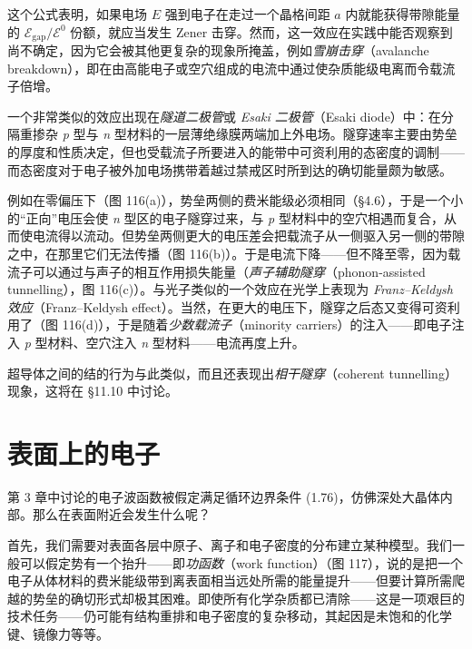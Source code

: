这个公式表明，如果电场 $E$ 强到电子在走过一个晶格间距 $a$ 内就能获得带隙能量的 $\mathcal{E}_{\mathrm{gap}}/\mathcal{E}^{0}$ 份额，就应当发生 Zener 击穿。然而，这一效应在实践中能否观察到尚不确定，因为它会被其他更复杂的现象所掩盖，例如\emph{雪崩击穿}（avalanche breakdown），即在由高能电子或空穴组成的电流中通过使杂质能级电离而令载流子倍增。


一个非常类似的效应出现在\emph{隧道二极管}或 \emph{Esaki 二极管}（Esaki diode）中：在分隔重掺杂 \emph{p} 型与 \emph{n} 型材料的一层薄绝缘膜两端加上外电场。隧穿速率主要由势垒的厚度和性质决定，但也受载流子所要进入的能带中可资利用的态密度的调制——而态密度对于电子被外加电场携带着越过禁戒区时所到达的确切能量颇为敏感。

例如在零偏压下（图 116(a)），势垒两侧的费米能级必须相同（§4.6），于是一个小的“正向”电压会使 \emph{n} 型区的电子隧穿过来，与 \emph{p} 型材料中的空穴相遇而复合，从而使电流得以流动。但势垒两侧更大的电压差会把载流子从一侧驱入另一侧的带隙之中，在那里它们无法传播（图 116(b)）。于是电流下降——但不降至零，因为载流子可以通过与声子的相互作用损失能量（\emph{声子辅助隧穿}（phonon-assisted tunnelling），图 116(c)）。与光子类似的一个效应在光学上表现为 \emph{Franz--Keldysh 效应}（Franz--Keldysh effect）。当然，在更大的电压下，隧穿之后态又变得可资利用了（图 116(d)），于是随着\emph{少数载流子}（minority carriers）的注入——即电子注入 \emph{p} 型材料、空穴注入 \emph{n} 型材料——电流再度上升。

超导体之间的结的行为与此类似，而且还表现出\emph{相干隧穿}（coherent tunnelling）现象，这将在 §11.10 中讨论。

\section{表面上的电子}

第 3 章中讨论的电子波函数被假定满足循环边界条件 (1.76)，仿佛深处大晶体内部。那么在表面附近会发生什么呢？

首先，我们需要对表面各层中原子、离子和电子密度的分布建立某种模型。我们一般可以假定势有一个抬升——即\emph{功函数}（work function）（图 117），说的是把一个电子从体材料的费米能级带到离表面相当远处所需的能量提升——但要计算所需爬越的势垒的确切形式却极其困难。即使所有化学杂质都已清除——这是一项艰巨的技术任务——仍可能有结构重排和电子密度的复杂移动，其起因是未饱和的化学键、镜像力等等。


